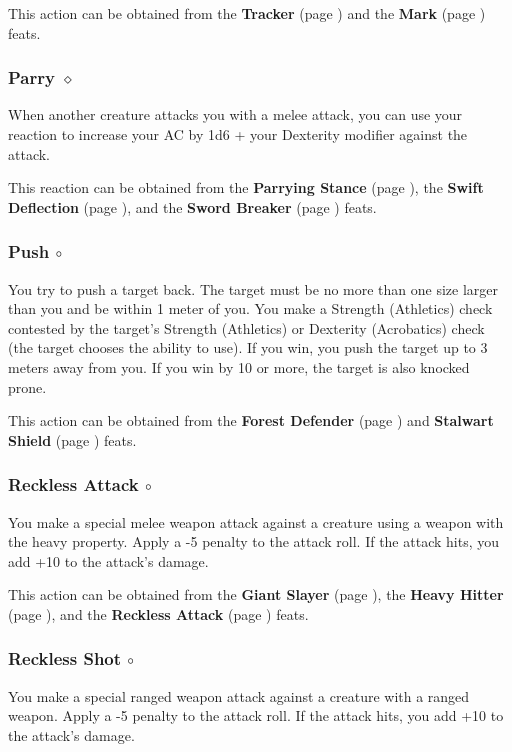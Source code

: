         This action can be obtained from the \textbf{Tracker} (page \pageref{feat::tracker}) and the \textbf{Mark} (page \pageref{feat::mark}) feats.
    \subsubsection{Parry $\diamond$} \label{act::parry}
        When another creature attacks you with a melee attack, you can use your reaction to increase your AC by 1d6 + your Dexterity modifier against the attack.

        This reaction can be obtained from the \textbf{Parrying Stance} (page \pageref{feat::parryingstance}), the \textbf{Swift Deflection} (page \pageref{feat::swiftdeflection}), and the \textbf{Sword Breaker} (page \pageref{feat::swordbreaker}) feats.
    \subsubsection{Push $\circ$} \label{act::push}
        You try to push a target back.
        The target must be no more than one size larger than you and be within 1 meter of you.
        You make a Strength (Athletics) check contested by the target's Strength (Athletics) or Dexterity (Acrobatics) check (the target chooses the ability to use).
        If you win, you push the target up to 3 meters away from you.
        If you win by 10 or more, the target is also knocked prone.

        This action can be obtained from the \textbf{Forest Defender} (page \pageref{feat::forestdefender}) and \textbf{Stalwart Shield} (page \pageref{feat::stalwartshield}) feats.
    \subsubsection{Reckless Attack $\circ$} \label{act::recklessattack}
        You make a special melee weapon attack against a creature using a weapon with the heavy property.
        Apply a -5 penalty to the attack roll.
        If the attack hits, you add +10 to the attack's damage.

        This action can be obtained from the \textbf{Giant Slayer} (page \pageref{feat::giantslayer}), the \textbf{Heavy Hitter} (page \pageref{feat::heavyhitter}), and the \textbf{Reckless Attack} (page \pageref{feat::recklessattack}) feats.
    \subsubsection{Reckless Shot $\circ$} \label{act::recklessshot}
        You make a special ranged weapon attack against a creature with a ranged weapon.
        Apply a -5 penalty to the attack roll.
        If the attack hits, you add +10 to the attack's damage.

